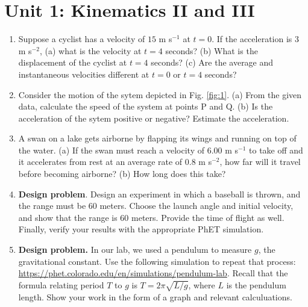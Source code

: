 \documentclass[10pt]{article}
\begin{document}
\section{Unit 1: Kinematics II and III}

\begin{enumerate}
\item Suppose a cyclist has a velocity of $15$ m s$^{-1}$ at $t=0$.  If the acceleration is 3 m s$^{-2}$, (a) what is the velocity at $t = 4$ seconds? (b) What is the displacement of the cyclist at $t = 4$ seconds? (c) Are the average and instantaneous velocities different at $t=0$ or $t=4$ seconds?  \\ \vspace{3cm}
\item Consider the motion of the sytem depicted in Fig. \ref{fig:1}.  (a) From the given data, calculate the speed of the system at points P and Q. (b) Is the acceleration of the sytem positive or negative?  Estimate the acceleration. \\ \vspace{3cm}
\item A swan on a lake gets airborne by flapping its wings and running on top of the water. (a) If the swan must reach a velocity of 6.00 m s$^{-1}$ to take off and it accelerates from rest at an average rate of 0.8 m s$^{-2}$, how far will it travel before becoming airborne? (b) How long does this take? \\ \vspace{3cm}
\item \textbf{Design problem}.  Design an experiment in which a baseball is thrown, and the range must be 60 meters.  Choose the launch angle and initial velocity, and show that the range is 60 meters.  Provide the time of flight as well.  Finally, verify your results with the appropriate PhET simulation. \\ \vspace{3cm}
\item \textbf{Design problem.}  In our lab, we used a pendulum to measure $g$, the gravitational constant.  Use the following simulation to repeat that process: \url{https://phet.colorado.edu/en/simulations/pendulum-lab}. Recall that the formula relating period $T$ to $g$ is $T = 2\pi\sqrt{L/g}$, where $L$ is the pendulum length. Show your work in the form of a graph and relevant calculuations. \\ \vspace{4cm}
\end{enumerate}
\end{document}
